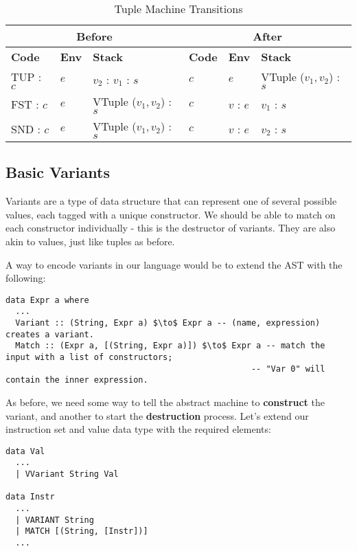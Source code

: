 \begin{table}[h]
    \centering
    \small
    \begin{tabular}{|l|l|l||l|l|l|}
        \hline
        \multicolumn{3}{|c||}{\textbf{Before}} & \multicolumn{3}{c|}{\textbf{After}} \\
        \hline
        \textbf{Code} & \textbf{Env} & \textbf{Stack} & \textbf{Code} & \textbf{Env} & \textbf{Stack} \\
        \hline
        TUP : \(c\) & \( e \) & \( v_2 \) : \( v_1 \) : \( s \) & \( c \) & \( e \) & VTuple (\( v_1, v_2 \)) : \( s \) \\
        FST : \(c\) & \( e \) & VTuple (\( v_1, v_2 \)) : \( s \) & \( c \) & \( v \) : \( e \) & \( v_1 \) : \( s \) \\
        SND : \(c\) & \( e \) & VTuple (\( v_1, v_2 \)) : \( s \) & \( c \) & \( v \) : \( e \) & \( v_2 \) : \( s \) \\
        \hline
    \end{tabular}
    \caption{Tuple Machine Transitions}
\end{table}

\subsection{Basic Variants}

Variants are a type of data structure that can represent one of several possible values,
each tagged with a unique constructor. We should be able to match on each constructor individually - this is the destructor of variants.
They are also akin to values, just like tuples as before.

A way to encode variants in our language would be to extend the AST with the following:

\begin{lstlisting}[mathescape]
data Expr a where
  ...
  Variant :: (String, Expr a) $\to$ Expr a -- (name, expression) creates a variant.
  Match :: (Expr a, [(String, Expr a)]) $\to$ Expr a -- match the input with a list of constructors;
                                                  -- "Var 0" will contain the inner expression.
\end{lstlisting}

As before, we need some way to tell the abstract machine to \textbf{construct} the variant, and another to start the \textbf{destruction} process.
Let's extend our instruction set and value data type with the required elements:

\begin{lstlisting}
data Val
  ...
  | VVariant String Val

data Instr
  ...
  | VARIANT String
  | MATCH [(String, [Instr])]
  ...
\end{lstlisting}

